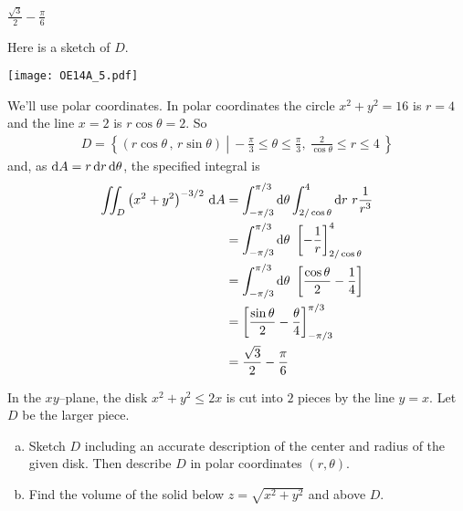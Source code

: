 \begin{answer}
$\frac{\sqrt{3}}{2}-\frac{\pi}{6}$
\end{answer}

\begin{solution}
Here is a sketch of $D$.

\begin{center}
     \texttt{[image: OE14A\_5.pdf]}
\end{center}

We'll use polar coordinates. In polar coordinates the circle $x^2+y^2=16$
is $r=4$ and the line $x=2$ is $r\cos\theta =2$. So
\begin{align*}
D = \left\{(r\cos\theta\,,\,r\sin\theta)\ \left|\ 
           -\frac{\pi}{3}\le\theta\le\frac{\pi}{3},\ 
           \frac{2}{\cos\theta}\le r\le 4\ \right.\right\}
\end{align*}
and, as $\mathrm{d}A = r\,\mathrm{d}r\,\mathrm{d}\theta$, the specified integral is
\begin{align*}
\dblInt_D\big(x^2+y^2\big)^{-3/2}\ \dee{A}
&= \int_{-\pi/3}^{\pi/3} \dee{\theta}\int_{2/\cos\theta}^4\dee{r}\ 
           r\frac{1}{r^3} \\
&= \int_{-\pi/3}^{\pi/3} \dee{\theta}\ 
           \left[-\frac{1}{r}\right]_{2/\cos\theta}^4 \\
&= \int_{-\pi/3}^{\pi/3} \dee{\theta}\ 
           \left[\frac{\cos\theta}{2}-\frac{1}{4}\right] \\
&=  \left[\frac{\sin\theta}{2}-\frac{\theta}{4}\right]_{-\pi/3}^{\pi/3} \\
&=\frac{\sqrt{3}}{2}-\frac{\pi}{6}
\end{align*}
\end{solution}

\begin{question}[M200 2014D] %
In the $xy$--plane, the disk $x^2 + y^2 \le 2x$ is cut into $2$ pieces 
by the line $y = x$. Let $D$ be the larger piece.
\begin{enumerate}[(a)]
\item
Sketch $D$ including an accurate description of the center and radius 
of the given disk. Then describe $D$ in polar coordinates $(r, \theta)$.
\item
Find the volume of the solid below $z = \sqrt{x^2 + y^2}$ and above $D$.
\end{enumerate}
\end{question}

%

